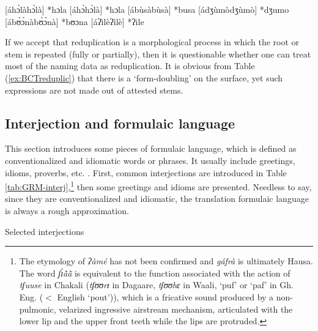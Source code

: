 \begin{exe}
\begin{exe}
\begin{exe}
{\begin{exe}
\begin{exe}
\begin{exe}
\begin{exe}
\begin{exe}
\begin{exe}
\begin{exe}
\begin{xlist}
\begin{exe}
\begin{exe}
\begin{exe}
\begin{exe}
\begin{exe}
\begin{exe}
\begin{exe}
\begin{exe}
\begin{exe}
\begin{exe}
\begin{exe}
\begin{exe}
\begin{exe}
\begin{exe}
\begin{exe}
	  [áhɔ̀làhɔ̀là]   *hɔla   
		[áhɔ̀hɔ̀là]    *hɔla   
	[ábùsàbùsà]	    *busa  
	[ádʒùmòdʒùmò]    *dʒumo  
	[ábʊ̀ɔ̀nàbʊ̀ɔ̀nà]		    *bʊɔna  
	[áʔìlèʔìlè]	    *ʔile 

\z
\z


If we accept that reduplication is a morphological process in which the root or 
stem is repeated (fully or partially), then it is questionable whether one can 
treat most of the naming data as reduplication. It is obvious from Table 
(\ref{ex:BCTreduplic}) that there is a `form-doubling' on the surface, yet such 
expressions  are not made out of attested stems.  


\subsection{Interjection and formulaic language}
\label{sec:GRM-greet}


This section introduces some pieces of formulaic language, which is defined as
conventionalized and idiomatic words or phrases. It usually include greetings,
idioms, proverbs,  etc. \citep{Wray05}. First, common
interjections are introduced in Table \ref{tab:GRM-interj},\footnote{The 
etymology
of {\it ʔàmé} has not been confirmed and {\it gáfrà} is ultimately Hausa. 
The word
{\it ʃɪ́ã̀ã̀} is equivalent to the
function  associated with the action of {\it tʃuuse} in Chakali ({\it tʃʊʊrɪ} in
Dagaare, {\it tʃʊʊhɛ} in Waali, `puf' or `paf'  in Gh.  Eng.  ($<$
English `pout')), which
is a
fricative sound produced by a non-pulmonic, velarized ingressive airstream
mechanism, articulated with the lower lip and the upper front teeth while the
lips are protruded.} then some greetings and idioms are presented. Needless to 
say, since
they are conventionalized and idiomatic, the translation formulaic language is
always a rough  approximation.



\begin{table}[!htb]
\small
\centering
\caption{Selected interjections \label{tab:GRM-interj}}


\end{table}
\end{exe}
\end{exe}
\end{exe}
\end{exe}
\end{exe}
\end{exe}
\end{exe}
\end{exe}
\end{exe}
\end{exe}
\end{exe}
\end{exe}
\end{exe}
\end{exe}
\end{exe}
\end{xlist}
\end{exe}
\end{exe}
\end{exe}
\end{exe}
\end{exe}
\end{exe}
\end{exe}}
\end{exe}
\end{exe}
\end{exe}
